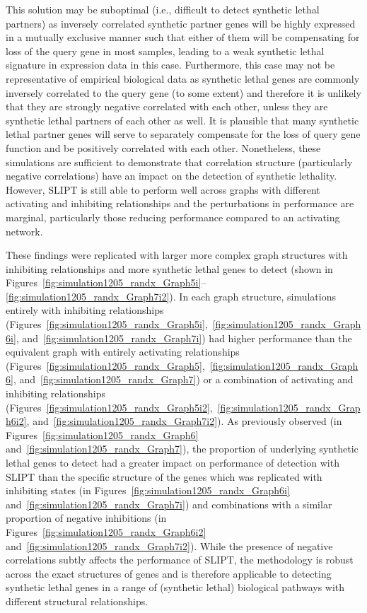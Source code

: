 This solution may be suboptimal (i.e., difficult to detect synthetic lethal partners) as inversely correlated synthetic partner genes will be highly expressed in a mutually exclusive manner such that either of them will be compensating for loss of the query gene in most samples, leading to a weak synthetic lethal signature in expression data in this case. Furthermore, this case may not be representative of empirical biological data as synthetic lethal genes are commonly inversely correlated to the query gene (to some extent) and therefore it is unlikely that they are strongly negative correlated with each other, unless they are synthetic lethal partners of each other as well. It is plausible that many synthetic lethal partner genes will serve to separately compensate for the loss of query gene function and be positively correlated with each other. Nonetheless, these simulations are sufficient to demonstrate that correlation structure (particularly negative correlations) have an impact on the detection of synthetic lethality. However, \gls{SLIPT} is still able to perform well across graphs with different activating and inhibiting relationships and the perturbations in performance are marginal, particularly those reducing performance compared to an activating network.  

These findings were replicated with larger more complex graph structures with inhibiting relationships and more synthetic lethal genes to detect (shown in Figures~\ref{fig:simulation1205_randx_Graph5i}\nobreakdash--\ref{fig:simulation1205_randx_Graph7i2}). In each graph structure, simulations entirely with inhibiting relationships (Figures~\ref{fig:simulation1205_randx_Graph5i},~\ref{fig:simulation1205_randx_Graph6i}, and~\ref{fig:simulation1205_randx_Graph7i}) had higher performance than the equivalent graph with entirely activating relationships (Figures~\ref{fig:simulation1205_randx_Graph5},~\ref{fig:simulation1205_randx_Graph6}, and~\ref{fig:simulation1205_randx_Graph7}) or a combination of activating and inhibiting relationships (Figures~\ref{fig:simulation1205_randx_Graph5i2},~\ref{fig:simulation1205_randx_Graph6i2}, and~\ref{fig:simulation1205_randx_Graph7i2}). As previously observed (in Figures~\ref{fig:simulation1205_randx_Graph6} and~\ref{fig:simulation1205_randx_Graph7}), the proportion of underlying synthetic lethal genes to detect had a greater impact on performance of detection with \gls{SLIPT} than the specific structure of the genes which was replicated with inhibiting states (in Figures~\ref{fig:simulation1205_randx_Graph6i} and~\ref{fig:simulation1205_randx_Graph7i}) and combinations with a similar proportion of negative inhibitions (in Figures~\ref{fig:simulation1205_randx_Graph6i2} and~\ref{fig:simulation1205_randx_Graph7i2}). While the presence of negative correlations subtly affects the performance of \gls{SLIPT}, the methodology is robust across the exact structures of genes and is therefore applicable to detecting synthetic lethal genes in a range of (synthetic lethal) biological pathways with different structural relationships.

